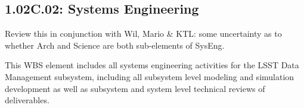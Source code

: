 \subsection*{1.02C.02: Systems Engineering}

\begin{note}
Review this in conjunction with Wil, Mario \& KTL: some uncertainty as to
whether Arch and Science are both sub-elements of SysEng.
\end{note}

This WBS element includes all systems engineering activities for the LSST Data
Management subsystem, including all subsystem level modeling and simulation
development as well as subsystem and system level technical reviews of
deliverables.
